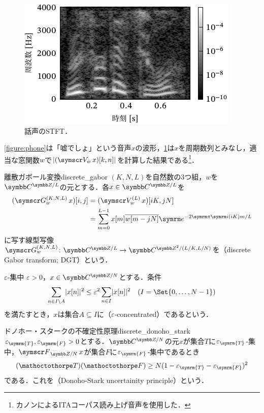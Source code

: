 \documentclass[../../main]{subfiles}
\begin{document}
\begin{figure}[htbp]
  \centering
  \includegraphics{figures/stft.pdf}
  \caption{話声のSTFT．}
  \label{figure:stft}
\end{figure}

\cref{figure:phone}は「嘘でしょ」という音声\(x\)の波形，\cref{figure:stft}は\(x\)を周期数列とみなし，適当な窓関数\(w\)で\(\abs{(\stft{w}x)[k,n]}\)を計算した結果である\footnote{カノン\cite{canon}によるITAコーパス読み上げ音声を使用した．}．

\begin{definition}{離散ガボール変換}{discrete_gabor}
  \((K,N,L)\)を自然数の3つ組，\(w\)を\(\cycles{\numset{C}}{L}\)の元とする．各\(x\in\cycles{\numset{C}}{L}\)を
  \begin{align*}
    (\dgt[K,N,L]{w}x)[i,j] &= (\stft[L]{w}x)[iK,jN] \\
    &= \sum_{m=0}^{L-1}x[m]\conj*{w[m-jN]}\napr^{-2\krez\iuni(iK)m/L}
  \end{align*}
  に写す線型写像\(\dgt[K,N,L]{w}\colon\cycles{\numset{C}}{L}\to\cycles[2]{\numset{C}}{L/K,L/N}\)を（discrete Gabor transform; DGT）という．
\end{definition}

\begin{definition}{\(\varepsilon\)‐集中}{}
  \(\varepsilon>0\)，\(x\in\cycles{\numset{C}}{N}\)とする．条件
  \[
    \sum_{n\in I\setminus A}\abs{x[n]}^2 \leq \varepsilon^2\sum_{n\in I}\abs{x[n]}^2\quad(I=\Set{0,\dots,N-1})
  \]
  を満たすとき，\(x\)は集合\(A\subseteq I\)に（\(\varepsilon\)‐concentrated）であるという．
\end{definition}

\begin{theorem}{ドノホー・スタークの不確定性原理}{discrete_donoho_stark}
  \(\varepsilon_{\symrm{T}},\varepsilon_{\symrm{F}}>0\)とする．\(\cycles{\numset{C}}{N}\)の元\(x\)が集合\(T\)に\(\varepsilon_{\symrm{T}}\)‐集中，\(\dft{N}x\)が集合\(F\)に\(\varepsilon_{\symrm{F}}\)‐集中であるとき
  \[
    (\sizeof{T})(\sizeof{F}) \geq N(1-\varepsilon_{\symrm{T}}-\varepsilon_{\symrm{F}})^2
  \]
  である．これを（Donoho‐Stark uncertainity principle）という．
\end{theorem}
\end{document}
